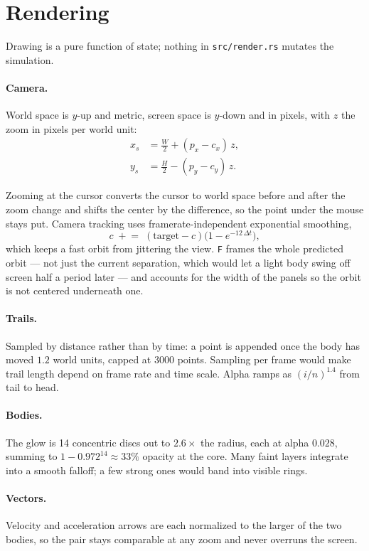 \documentclass[11pt,a4paper]{article}
\newcommand{\dt}{\Delta t}
\begin{document}
\section{Rendering}

Drawing is a pure function of state; nothing in \texttt{src/render.rs} mutates
the simulation.

\paragraph{Camera.} World space is $y$-up and metric, screen space is $y$-down
and in pixels, with $z$ the zoom in pixels per world unit:
\begin{align*}
  x_s &= \frac{W}{2} + (p_x - c_x)\,z,\\
  y_s &= \frac{H}{2} - (p_y - c_y)\,z.
\end{align*}

Zooming at the cursor converts the cursor to world space before and after the
zoom change and shifts the center by the difference, so the point under the
mouse stays put. Camera tracking uses framerate-independent exponential
smoothing,
\[
  c \;\mathrel{+}=\; (\text{target} - c)\bigl(1 - e^{-12\,\dt}\bigr),
\]
which keeps a fast orbit from jittering the view. \texttt{F} frames the whole
predicted orbit --- not just the current separation, which would let a light
body swing off screen half a period later --- and accounts for the width of the
panels so the orbit is not centered underneath one.

\paragraph{Trails.} Sampled by distance rather than by time: a point is appended
once the body has moved $1.2$ world units, capped at $3000$ points. Sampling per
frame would make trail length depend on frame rate and time scale. Alpha ramps
as $(i/n)^{1.4}$ from tail to head.

\paragraph{Bodies.} The glow is 14 concentric discs out to $2.6\times$ the
radius, each at alpha $0.028$, summing to
$1 - 0.972^{14} \approx 33\%$ opacity at the core. Many faint layers integrate
into a smooth falloff; a few strong ones would band into visible rings.

\paragraph{Vectors.} Velocity and acceleration arrows are each normalized to the
larger of the two bodies, so the pair stays comparable at any zoom and never
overruns the screen.
\end{document}
